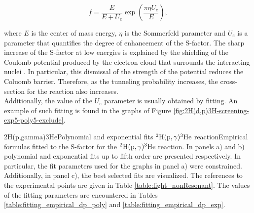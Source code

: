 \documentclass[openany]{book}
\begin{document}
\begin{equation}\label{eq:screening_factor}
	f = \frac{E}{E + U_e}\exp{\left(\frac{\pi \eta U_e}{E}\right)},
\end{equation}

where $E$ is the center of mass energy, $\eta$ is the Sommerfeld parameter and $U_e$ is a parameter that quantifies the degree of enhancement of the S-factor. The sharp increase of the S-factor at low energies is explained by the shielding of the Coulomb potential produced by the electron cloud that surrounds the interacting nuclei \cite{assenbaum_langanke_rolfs_1987}. In particular, this dismissal of the strength of the potential reduces the Coluomb barrier. Therefore, as the tunneling probability increases, the cross-section for the reaction also increases. \\

Additionally, the value of the $U_e$ parameter is usually obtained by fitting. An example of such fitting is found in the graphs of Figure \ref{fig:2H(d,p)3H-screening-exp5-poly5-exclude}.



{2H(p,gamma)3He}{Polynomial and exponential fits $\mathrm{{}^{2}H(p, \gamma){}^{3}He}$ reaction}{Empirical formulas fitted to the S-factor for the $\mathrm{{}^{2}H(p, \gamma){}^{3}He}$ reaction. In panels a) and b) polynomial and exponential fits up to fifth order are presented respectively.  In particular, the fit parameters used for the graphs in panel a) were constrained. Additionally, in panel c), the best selected fits are visualized. The references to the experimental points are given in Table \ref{table:light_nonResonant}. The values of the fitting parameters are encountered in Tables \ref{table:fitting_empirical_dp_poly} and \ref{table:fitting_empirical_dp_exp}.}
\end{document}
